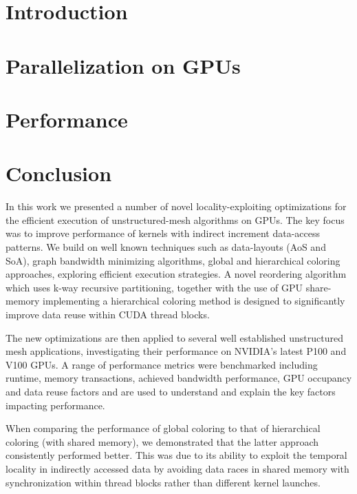 \documentclass[number]{elsarticle}
\begin{document}
\section{Introduction}\label{introduction}



\section{Parallelization on GPUs}\label{parallelisation-on-gpu}



\section{Performance}\label{performance}




\section{Conclusion}\label{conclusion}

In this work we presented a number of novel locality-exploiting optimizations 
for the efficient execution of unstructured-mesh algorithms on GPUs. The key 
focus was to improve performance of kernels with indirect increment data-access 
patterns. We build on well known techniques such as data-layouts (AoS and SoA), 
graph bandwidth minimizing algorithms, global and hierarchical coloring 
approaches, exploring efficient execution strategies. A novel reordering 
algorithm which uses k-way recursive partitioning, together with the use of GPU 
share-memory implementing a hierarchical coloring method is designed 
to significantly improve data reuse within CUDA thread blocks.

The new optimizations are then applied to several well established unstructured
mesh applications, investigating their performance on NVIDIA’s latest P100
and V100 GPUs. A range of performance metrics were benchmarked including 
runtime, memory transactions, achieved bandwidth performance, GPU occupancy and 
data reuse factors and are used to understand and explain the key factors 
impacting performance.

When comparing the performance of global coloring to that of hierarchical 
coloring (with shared memory), we demonstrated that the latter approach 
consistently performed better. This was due to its ability to exploit the 
temporal locality in indirectly accessed data by avoiding data races in shared 
memory with synchronization within thread blocks rather than different kernel 
launches.
\end{document}
